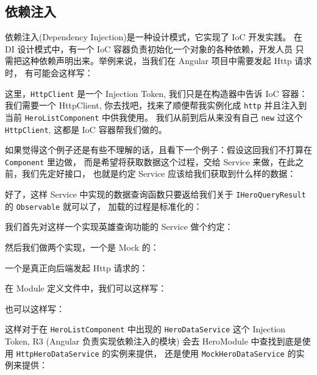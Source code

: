 \documentclass{ctexart}
\begin{document}
    \subsection{依赖注入}

    依赖注入(Dependency Injection)是一种设计模式，它实现了 IoC 开发实践。
    在 DI 设计模式中，有一个 IoC 容器负责初始化一个对象的各种依赖，开发人员
    只需把这种依赖声明出来。举例来说，当我们在 Angular 项目中需要发起 Http 请求时，
    有可能会这样写：

    

    这里，\verb`HttpClient` 是一个 Injection Token, 我们只是在构造器中告诉 IoC 容器：
    我们需要一个 HttpClient, 你去找吧，找来了顺便帮我实例化成 \verb`http` 并且注入到当前 \verb`HeroListComponent` 中供我使用。
    我们从前到后从来没有自己 \verb`new` 过这个 \verb`HttpClient`, 这都是 IoC 容器帮我们做的。

    如果觉得这个例子还是有些不理解的话，且看下一个例子：假设这回我们不打算在 \verb`Component` 里边做，
    而是希望将获取数据这个过程，交给 Service 来做，在此之前，我们先定好接口，
    也就是约定 Service 应该给我们获取到什么样的数据：

    

    好了，这样 Service 中实现的数据查询函数只要返给我们关于 \verb`IHeroQueryResult` 的 \verb`Observable` 就可以了，
    加载的过程是标准化的：

    

    我们首先对这样一个实现英雄查询功能的 Service 做个约定：

    

    然后我们做两个实现，一个是 Mock 的：

    
    
    一个是真正向后端发起 Http 请求的：

    

    在 Module 定义文件中，我们可以这样写：

    

    也可以这样写：

    

    这样对于在 \verb`HeroListComponent` 中出现的 \verb`HeroDataService` 这个 Injection Token, 
    R3 (Angular 负责实现依赖注入的模块) 会去 HeroModule 中查找到底是使用 \verb`HttpHeroDataService` 的实例来提供，
    还是使用 \verb`MockHeroDataService` 的实例来提供：
\end{document}
